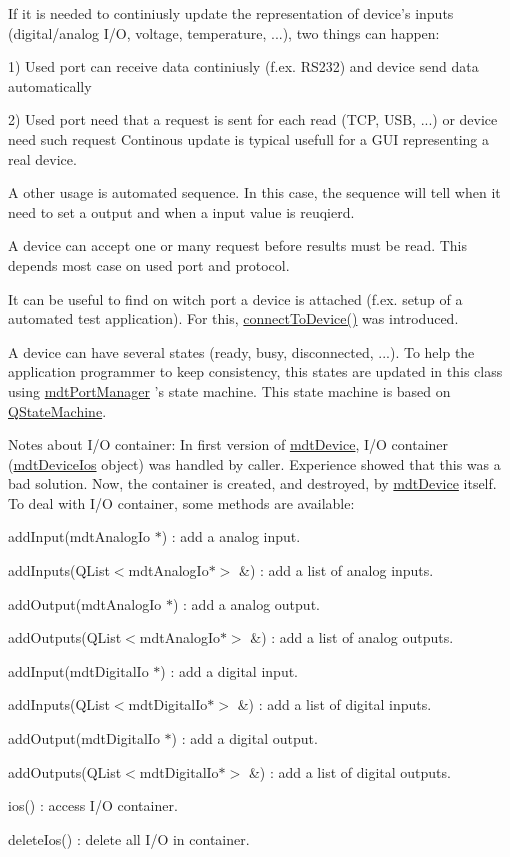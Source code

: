 If it is needed to continiusly update the representation of device's inputs (digital/analog I/\-O, voltage, temperature, ...), two things can happen\-:
\begin{DoxyItemize}
\item 1) Used port can receive data continiusly (f.\-ex. R\-S232) and device send data automatically
\item 2) Used port need that a request is sent for each read (T\-C\-P, U\-S\-B, ...) or device need such request Continous update is typical usefull for a G\-U\-I representing a real device.
\end{DoxyItemize}

A other usage is automated sequence. In this case, the sequence will tell when it need to set a output and when a input value is reuqierd.

A device can accept one or many request before results must be read. This depends most case on used port and protocol.

It can be useful to find on witch port a device is attached (f.\-ex. setup of a automated test application). For this, \hyperlink{classmdt_device_ac57bc624391a4035b20bfd29dbbea7da}{connect\-To\-Device()} was introduced.

A device can have several states (ready, busy, disconnected, ...). To help the application programmer to keep consistency, this states are updated in this class using \hyperlink{classmdt_port_manager}{mdt\-Port\-Manager} 's state machine. This state machine is based on \hyperlink{class_q_state_machine}{Q\-State\-Machine}.

Notes about I/\-O container\-: In first version of \hyperlink{classmdt_device}{mdt\-Device}, I/\-O container (\hyperlink{classmdt_device_ios}{mdt\-Device\-Ios} object) was handled by caller. Experience showed that this was a bad solution. Now, the container is created, and destroyed, by \hyperlink{classmdt_device}{mdt\-Device} itself. To deal with I/\-O container, some methods are available\-:
\begin{DoxyItemize}
\item add\-Input(mdt\-Analog\-Io $\ast$) \-: add a analog input.
\item add\-Inputs(\-Q\-List$<$mdt\-Analog\-Io$\ast$$>$ \&) \-: add a list of analog inputs.
\item add\-Output(mdt\-Analog\-Io $\ast$) \-: add a analog output.
\item add\-Outputs(\-Q\-List$<$mdt\-Analog\-Io$\ast$$>$ \&) \-: add a list of analog outputs.
\item add\-Input(mdt\-Digital\-Io $\ast$) \-: add a digital input.
\item add\-Inputs(\-Q\-List$<$mdt\-Digital\-Io$\ast$$>$ \&) \-: add a list of digital inputs.
\item add\-Output(mdt\-Digital\-Io $\ast$) \-: add a digital output.
\item add\-Outputs(\-Q\-List$<$mdt\-Digital\-Io$\ast$$>$ \&) \-: add a list of digital outputs.
\item ios() \-: access I/\-O container.
\item delete\-Ios() \-: delete all I/\-O in container. 
\end{DoxyItemize}


